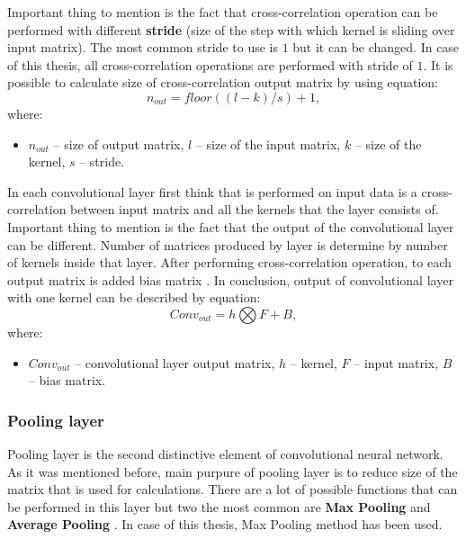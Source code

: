     Important thing to mention is the fact that cross-correlation operation can be performed with different \textbf{stride} (size of the step with which kernel is sliding over input matrix). The most common stride to use is $1$ but it can be changed. In case of this thesis, all cross-correlation operations are performed with stride of $1$. It is possible to calculate size of cross-correlation output matrix by using equation:
    \begin{equation}
        n_{out} = floor((l - k) / s) + 1,
    \end{equation}
    where:
    \begin{itemize}[label=]
        \item $n_{out}$ -- size of output matrix, $l$ -- size of the input matrix, $k$ -- size of the kernel, $s$ -- stride.
    \end{itemize}

    In each convolutional layer first think that is performed on input data is a cross-correlation between input matrix and all the kernels that the layer consists of. Important thing to mention is the fact that the output of the convolutional layer can be different. Number of matrices produced by layer is determine by number of kernels inside that layer. After performing cross-correlation operation, to each output matrix is added bias matrix \cite{bib:internet-aa-cnn-lecture}. In conclusion, output of convolutional layer with one kernel can be described by equation:
    \begin{equation}
        Conv_{out} = h \bigotimes F + B,
    \end{equation}
    where:
    \begin{itemize}[label=]
        \item $Conv_{out}$ -- convolutional layer output matrix, $h$ -- kernel, $F$ -- input matrix, $B$ -- bias matrix.
    \end{itemize}

    \subsubsection*{Pooling layer}\label{sec:pooling-layer}
    Pooling layer is the second distinctive element of convolutional neural network. As it was mentioned before, main purpure of pooling layer is to reduce size of the matrix that is used for calculations. There are a lot of possible functions that can be performed in this layer but two the most common are \textbf{Max Pooling} and \textbf{Average Pooling} \cite{bib:book-pooling-methods}. In case of this thesis, Max Pooling method has been used. 

